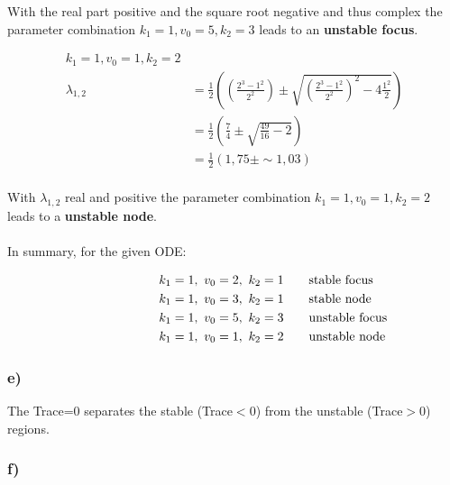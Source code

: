 \documentclass[]{scrartcl}
\begin{document}
With the real part positive and the square root negative and thus complex the parameter combination $k_1 = 1, v_0 = 5, k_2 = 3$ leads to an \textbf{unstable focus}.

\begin{center}
\begin{align*}
	k_1 = 1, v_0 = 1, k_2 = 2 & \\
	\lambda_{1,2}	& =  \frac{1}{2} \left( \left( \frac{2^3 - 1^2}{2^2} \right) \pm \sqrt{ \left( \frac{2^3 - 1^2}{2^2}  \right)^2 - 4 \frac{1^2}{2} } \right) \\
					& =  \frac{1}{2} \left( \frac{7}{4} \pm \sqrt{ \frac{49}{16} - 2 } \right) \\
					& =  \frac{1}{2} \left( 1,75 \pm \sim 1,03 \right) \\
\end{align*}
\end{center}

With $\lambda_{1,2}$ real and positive the parameter combination $k_1 = 1, v_0 = 1, k_2 = 2$ leads to a \textbf{unstable node}.
\\
\\
In summary, for the given ODE:

\begin{center}
\begin{align*}
	k_1 = 1, ~ v_0 = 2, ~ k_2 = 1 & \hspace{1em} & \rlap{stable focus} \\
	k_1 = 1, ~ v_0 = 3, ~ k_2 = 1 & \hspace{1em} & \rlap{stable node} \\
	k_1 = 1, ~ v_0 = 5, ~ k_2 = 3 & \hspace{1em} & \rlap{unstable focus} \\
	k_1 = 1, ~ v_0 = 1, ~ k_2 = 2 & \hspace{1em} & \rlap{unstable node} \\
\end{align*}
\end{center}


\subsubsection*{e)}

The Trace=0 separates the stable (Trace$<0$) from the unstable (Trace$>0$) regions.


\subsubsection*{f)}
\end{document}
